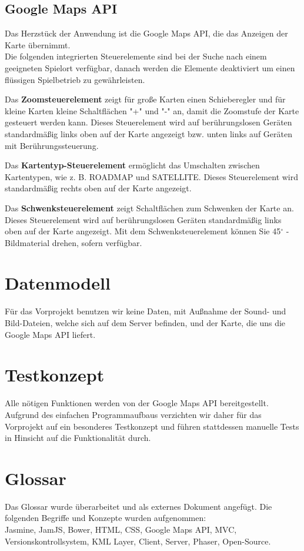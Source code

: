 \documentclass[11pt,a4paper]{article}
\begin{document}
\subsection{Google Maps API}

Das Herzstück der Anwendung ist die Google Maps API, die das Anzeigen der Karte übernimmt.\\
Die folgenden integrierten Steuerelemente sind bei der Suche nach einem geeigneten Spielort verfügbar, danach werden die Elemente deaktiviert um einen flüssigen Spielbetrieb zu gewährleisten. \par\bigskip
Das \textbf{Zoomsteuerelement} zeigt für große Karten einen Schieberegler und für kleine Karten kleine Schaltflächen "+" und "-" an, damit die Zoomstufe der Karte gesteuert werden kann. Dieses Steuerelement wird auf berührungslosen Geräten standardmäßig links oben auf der Karte angezeigt bzw. unten links auf Geräten mit Berührungssteuerung.\par\bigskip
Das \textbf{Kartentyp-Steuerelement} ermöglicht das Umschalten zwischen Kartentypen, wie z. B. ROADMAP und SATELLITE. Dieses Steuerelement wird standardmäßig rechts oben auf der Karte angezeigt.\par\bigskip
Das \textbf{Schwenksteuerelement} zeigt Schaltflächen zum Schwenken der Karte an. Dieses Steuerelement wird auf berührungslosen Geräten standardmäßig links oben auf der Karte angezeigt. Mit dem Schwenksteuerelement können Sie 45$^\circ$ -Bildmaterial drehen, sofern verfügbar.


\section{Datenmodell}
Für das Vorprojekt benutzen wir keine Daten, mit Außnahme der Sound- und Bild-Dateien, welche sich auf dem Server befinden, und der Karte, die uns die Google Maps API liefert.

\section{Testkonzept}
Alle nötigen Funktionen werden von der Google Maps API bereitgestellt.
Aufgrund des einfachen Programmaufbaus verzichten wir daher für das Vorprojekt auf ein besonderes Testkonzept und führen stattdessen manuelle Tests in Hinsicht auf die Funktionalität durch.
\section{Glossar}
Das Glossar wurde überarbeitet und als externes Dokument angefügt.
Die folgenden Begriffe und Konzepte wurden aufgenommen: \\
Jasmine, JamJS, Bower, HTML, CSS, Google Maps API, MVC, Versionskontrollsystem, KML Layer, Client, Server, Phaser, Open-Source.
\end{document}
